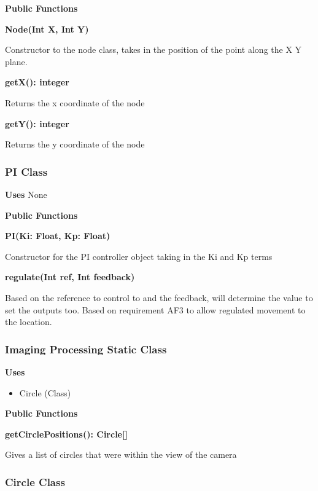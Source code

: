 \documentclass [10pt]{article}
\begin{document}
\textbf{Public Functions}

\textbf{Node(Int X, Int Y)}

Constructor to the node class, takes in the position of the point along the X Y plane.

\textbf{getX(): integer}


Returns the x coordinate of the node

\textbf{getY(): integer}

Returns the y coordinate of the node


\subsubsection{PI Class}
\textbf{Uses}
None 

\textbf{Public Functions}

\textbf{PI(Ki: Float, Kp: Float)}

Constructor for the PI controller object taking in the Ki and Kp terms

\textbf{regulate(Int ref, Int feedback)}

Based on the reference to control to and the feedback, will determine the value to set the outputs too.  Based on requirement AF3 to allow regulated movement to the location.


\subsubsection{Imaging Processing Static Class}
\textbf{Uses}
\begin{itemize}
	\item Circle (Class)
\end{itemize}

\textbf{Public Functions}

\textbf{getCirclePositions(): Circle[]}

Gives a list of circles that were within the view of the camera


\subsubsection{Circle Class}
\end{document}
